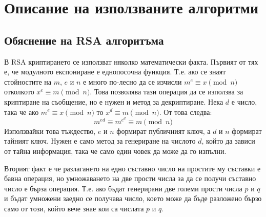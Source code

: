 \section{Описание на използваните алгоритми} \label{algos}
  \subsection{Обяснение на RSA алгоритъма} \label{rsa}
  В RSA криптирането се използват няколко математически факта. Първият от тях е, че модулното експониране е еднопосочна функция. Т.е. ако се знаят стойностите на $m$, $e$ и $n$ е много по-лесно да се изчисли $m^e \equiv x \pmod{n}$ отколкото $x^e \equiv m \pmod{n}$. Това позволява тази операция да се използва за криптиране на съобщение, но е нужен и метод за декриптиране. Нека $d$ е число, така че ако $m^e \equiv x \pmod{n}$ то $x^d \equiv m \pmod{n}$. От това следва:
  \begin{equation}
    m^{ed} \equiv m^{e^d} \equiv m \pmod{n}
    \label{rsa-key-cancelation}
  \end{equation}
  Използвайки това тъждество, $e$ и $n$ формират публичният ключ, а $d$ и $n$ формират тайният ключ. Нужен е само метод за генериране на числото $d$, който да зависи от тайна информация, така че само един човек да може да го изпълни.

  Вторият факт е че разлагането на едно съставно число на простите му съставки е бавна операция, но умножаването на две прости числа за да се получи съставно число е бърза операция. Т.е. ако бъдат генерирани две големи прости числа $p$ и $q$ и бъдат умножени заедно се получава число, което може да бъде разложено бързо само от този, който вече знае кои са числата $p$ и $q$.


